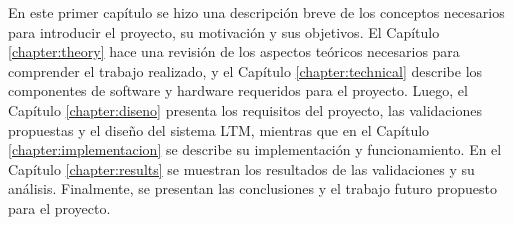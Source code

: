 En este primer capítulo se hizo una descripción breve de los conceptos necesarios para introducir el proyecto, su motivación y sus objetivos. El Capítulo \ref{chapter:theory} hace una revisión de los aspectos teóricos necesarios para comprender el trabajo realizado, y el Capítulo \ref{chapter:technical} describe los componentes de software y hardware requeridos para el proyecto. Luego, el Capítulo \ref{chapter:diseno} presenta los requisitos del proyecto, las validaciones propuestas y el diseño del sistema LTM, mientras que en el Capítulo \ref{chapter:implementacion} se describe su implementación y funcionamiento. En el Capítulo \ref{chapter:results} se muestran los resultados de las validaciones y su análisis. Finalmente, se presentan las conclusiones y el trabajo futuro propuesto para el proyecto.




